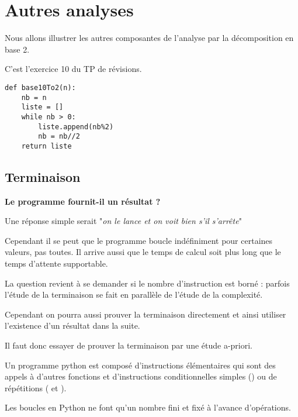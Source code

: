 \section{Autres analyses}
Nous allons illustrer les autres composantes de l'analyse par la décomposition en base 2.

C'est l'exercice 10 du TP de révisions.
\begin{lstlisting}
def base10To2(n):
    nb = n
    liste = []
    while nb > 0:
        liste.append(nb%2)
        nb = nb//2
    return liste
\end{lstlisting}
\subsection{Terminaison}
{\bf Le programme fournit-il un résultat ?}

Une réponse simple serait "{\it on le lance et on voit bien s'il s'arrête}"

Cependant il se peut que le programme boucle indéfiniment pour certaines valeurs, pas toutes. Il arrive aussi que le temps de calcul soit plus long que le temps d'attente supportable. 

La question revient à se demander si le nombre d'instruction est borné : parfois l'étude de la terminaison se fait en parallèle de l'étude de la complexité.

Cependant on pourra aussi prouver la terminaison directement et ainsi utiliser l'existence d'un résultat dans la suite.

Il faut donc essayer de prouver la terminaison par une étude a-priori.

Un programme python est composé d'instructions élémentaires qui sont des appels à d'autres fonctions et d'instructions conditionnelles simples () ou de répétitions ( et ). 

Les boucles  en Python ne font qu'un nombre fini et fixé à l'avance d'opérations.

